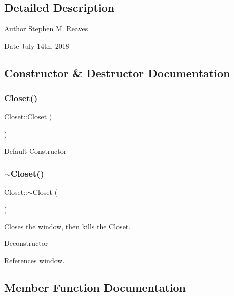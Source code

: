 \subsection{Detailed Description}
\begin{DoxyAuthor}{Author}
Stephen M. Reaves 
\end{DoxyAuthor}
\begin{DoxyDate}{Date}
July 14th, 2018 
\end{DoxyDate}


\subsection{Constructor \& Destructor Documentation}
\mbox{\label{classCloset_a42a132f9c1f9fe46976dea604f23055c}} 
\subsubsection{\texorpdfstring{Closet()}{Closet()}}
{\footnotesize\ttfamily Closet\+::\+Closet (\begin{DoxyParamCaption}{ }\end{DoxyParamCaption})}

Default Constructor \mbox{\label{classCloset_a5afebda9b625af231a1d980ff851b2a3}} 
\subsubsection{\texorpdfstring{$\sim$\+Closet()}{~Closet()}}
{\footnotesize\ttfamily Closet\+::$\sim$\+Closet (\begin{DoxyParamCaption}{ }\end{DoxyParamCaption})\hspace{0.3cm}{\ttfamily [virtual]}}



Closes the window, then kills the \mbox{\hyperlink{classCloset}{Closet}}. 

Deconstructor 

References \mbox{\hyperlink{classCloset_af1eb4f786cc4eccd3018b90632236a93}{window}}.



\subsection{Member Function Documentation}
\mbox{\label{classCloset_ad81782f2bb110f3a0a635a5ac1f929eb}} 
